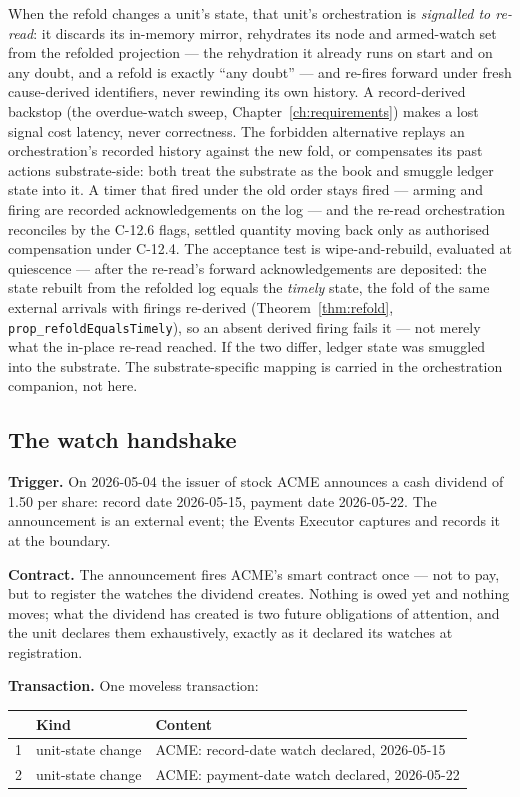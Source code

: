 \documentclass[11pt,a4paper]{article}
\begin{document}
When the refold changes a unit's state, that unit's orchestration is \emph{signalled to re-read}:
it discards its in-memory mirror, rehydrates its node and armed-watch set from the refolded
projection --- the rehydration it already runs on start and on any doubt, and a refold is exactly
``any doubt'' --- and re-fires forward under fresh cause-derived identifiers, never rewinding its
own history. A record-derived backstop (the overdue-watch sweep, Chapter~\ref{ch:requirements})
makes a lost signal cost latency, never correctness. The forbidden alternative replays an
orchestration's recorded history against the new fold, or compensates its past actions
substrate-side: both treat the substrate as the book and smuggle ledger state into it. A timer
that fired under the old order stays fired --- arming and firing are recorded acknowledgements on
the log --- and the re-read orchestration reconciles by the C-12.6 flags, settled quantity moving
back only as authorised compensation under C-12.4. The acceptance test is wipe-and-rebuild,
evaluated at quiescence --- after the re-read's forward acknowledgements are deposited: the state
rebuilt from the refolded log equals the \emph{timely} state, the
fold of the same external arrivals with firings re-derived (Theorem~\ref{thm:refold},
\texttt{prop\_refoldEqualsTimely}), so an absent derived firing fails it --- not merely what the
in-place re-read reached. If the two differ, ledger state was smuggled into the substrate. The
substrate-specific mapping is carried in the orchestration companion, not here.

\subsection{The watch handshake}

\textbf{Trigger.} On 2026-05-04 the issuer of stock ACME announces a cash
dividend of 1.50 per share: record date 2026-05-15, payment date 2026-05-22.
The announcement is an external event; the Events Executor captures and records
it at the boundary.

\textbf{Contract.} The announcement fires ACME's smart contract once --- not to
pay, but to register the watches the dividend creates. Nothing is owed yet and
nothing moves; what the dividend has created is two future obligations of
attention, and the unit declares them exhaustively, exactly as it declared its
watches at registration.

\textbf{Transaction.} One moveless transaction:

\begin{center}
\begin{tabular}{@{}rll@{}}
\toprule
 & Kind & Content \\
\midrule
1 & unit-state change & ACME: record-date watch declared, 2026-05-15 \\
2 & unit-state change & ACME: payment-date watch declared, 2026-05-22 \\
\bottomrule
\end{tabular}
\end{center}
\end{document}
